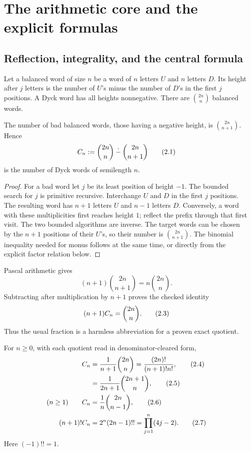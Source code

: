 \section{The arithmetic core and the explicit formulas}
\label{sec:arithmetic}

\subsection{Reflection, integrality, and the central formula}

Let a balanced word of size $n$ be a word of $n$ letters $U$ and $n$ letters
$D$.  Its height after $j$ letters is the number of $U$'s minus the number of
$D$'s in the first $j$ positions.  A Dyck word has all heights nonnegative.
There are $\binom{2n}{n}$ balanced words.

\begin{theorem}
\label{thm:reflection}
The number of bad balanced words, those having a negative height, is
$\binom{2n}{n+1}$.  Hence
\[
 C_n:=\binom{2n}{n}\mathbin{\mathop{\dot{-}}}\binom{2n}{n+1}
\tag{2.1}\label{eq:cat-difference}
\]
is the number of Dyck words of semilength $n$.
\end{theorem}

\begin{proof}
For a bad word let $j$ be its least position of height $-1$.  The bounded
search for $j$ is primitive recursive.  Interchange $U$ and $D$ in the first
$j$ positions.  The resulting word has $n+1$ letters $U$ and $n-1$ letters
$D$.  Conversely, a word with these multiplicities first reaches height $1$;
reflect the prefix through that first visit.  The two bounded algorithms are
inverse.  The target words can be chosen by the $n+1$ positions of their $U$'s,
so their number is $\binom{2n}{n+1}$.  The binomial inequality needed for
monus follows at the same time, or directly from the explicit factor relation
below.
\end{proof}

Pascal arithmetic gives
\[
 (n+1)\binom{2n}{n+1}=n\binom{2n}{n}.
\tag{2.2}\label{eq:adjacent-binomial}
\]
Subtracting after multiplication by $n+1$ proves the checked identity
\[
 (n+1)C_n=\binom{2n}{n}.
\tag{2.3}\label{eq:cat-central-cleared}
\]
Thus the usual fraction is a harmless abbreviation for a proven exact
quotient.

\begin{corollary}
For $n\ge0$, with each quotient read in denominator-cleared form,
\begin{align}
 C_n
 &=\frac1{n+1}\binom{2n}{n}
  =\frac{(2n)!}{(n+1)!n!},                                      \tag{2.4}\label{eq:factorial}\\
 &=\frac1{2n+1}\binom{2n+1}{n},                                 \tag{2.5}\label{eq:odd-binomial}\\
 (n\ge1)\qquad
 C_n&=\frac1n\binom{2n}{n-1},                                \tag{2.6}\label{eq:n-binomial}\\
 (n+1)!C_n&=2^n(2n-1)!!=\prod_{j=1}^{n}(4j-2).                \tag{2.7}\label{eq:product}
\end{align}
Here $(-1)!!=1$.
\end{corollary}


